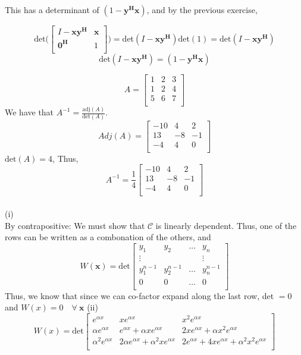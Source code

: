 \documentclass[letterpaper,12pt]{article}
\theoremstyle{definition}
\begin{document}
This has a determinant of $(1- \mathbf{y^Hx} )$, and by the previous exercise,

\[
 \text{det}  \Big(
\begin{bmatrix}
    I-\mathbf{xy^H} & \mathbf{x} \\
    \mathbf{0^H} & 1 \\
\end{bmatrix}
 \Big)
 = \text{det}(I - \mathbf{xy^H} ) \text{det}(1) = \text{det}(I - \mathbf{xy^H} )
 \]
 \[\text{det}(I - \mathbf{xy^H} )
= (1- \mathbf{y^Hx})\]

\[A = 
\begin{bmatrix}
    1& 2 & 3 \\
    1& 2 & 4 \\
    5& 6 & 7 \\
\end{bmatrix}
\]
We have that $A^{-1} = \frac{\text{adj}(A) }{\text{det}(A)}$.
\[Adj(A) = 
\begin{bmatrix}
    -10 & 4 & 2 \\
    13 & -8 & -1 \\
    -4 & 4 & 0 \\
\end{bmatrix}
\]
$\text{det}(A) = 4$, Thus,
\[ A^{-1} =
\frac{1}{4}
\begin{bmatrix}
    -10 & 4 & 2 \\
    13 & -8 & -1 \\
    -4 & 4 & 0 \\
\end{bmatrix}
\]
\\
(i)\\
By contrapositive:
We must show that  $\mathscr{C} $ is linearly dependent. Thus, one of the rows can be written as a combonation of the others, and 
\[
W(\mathbf{x}) = \text{det}\begin{bmatrix}
    y_1 & y_2 & \dots & y_n \\
    \vdots  & & & \vdots \\

    y_1^{n-1} & y_2^{n-1} & \dots & y_n^{n-1} \\
    0 & 0 & \dots & 0\\
\end{bmatrix}
\]
Thus, we know that since we can co-factor expand along the last row, det $= 0$ and $W(x) = 0 \quad \forall ~ \mathbf{x}$
(ii)\\
\[
W(x) = \text{det} 
\begin{bmatrix}
    e^{\alpha x} & x e^{\alpha x} & x^2 e^{\alpha x} \\
    \alpha e^{\alpha x} & e^{\alpha x} + \alpha x e^{\alpha x} & 2xe^{\alpha x} + \alpha x^2 e^{\alpha x} \\
    \alpha^2 e^{\alpha x} & 2 \alpha e^{\alpha x} + \alpha^2 x e^{\alpha x} & 2e^{\alpha x} + 4xe^{\alpha x} + \alpha^2 x^2 e^{\alpha x} \\
\end{bmatrix}
\]
\end{document}
